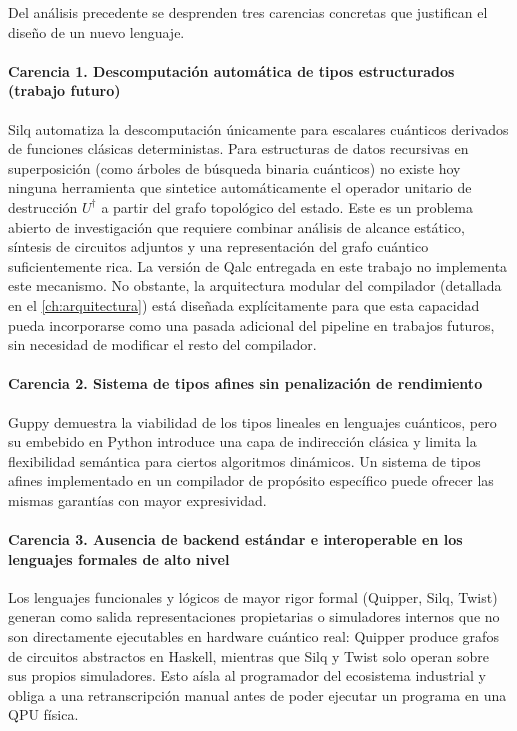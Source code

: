 Del análisis precedente se desprenden tres carencias concretas que justifican el diseño de un nuevo lenguaje.

\paragraph{Carencia 1. Descomputación automática de tipos estructurados (trabajo futuro)}
Silq automatiza la descomputación únicamente para escalares cuánticos derivados de funciones clásicas deterministas. Para estructuras de datos recursivas en superposición (como árboles de búsqueda binaria cuánticos) no existe hoy ninguna herramienta que sintetice automáticamente el operador unitario de destrucción $U^\dagger$ a partir del grafo topológico del estado. Este es un problema abierto de investigación que requiere combinar análisis de alcance estático, síntesis de circuitos adjuntos y una representación del grafo cuántico suficientemente rica. La versión de Qalc entregada en este trabajo no implementa este mecanismo. No obstante, la arquitectura modular del compilador (detallada en el \autoref{ch:arquitectura}) está diseñada explícitamente para que esta capacidad pueda incorporarse como una pasada adicional del pipeline en trabajos futuros, sin necesidad de modificar el resto del compilador.

\paragraph{Carencia 2. Sistema de tipos afines sin penalización de rendimiento}
Guppy demuestra la viabilidad de los tipos lineales en lenguajes cuánticos, pero su embebido en Python introduce una capa de indirección clásica y limita la flexibilidad semántica para ciertos algoritmos dinámicos. Un sistema de tipos afines implementado en un compilador de propósito específico puede ofrecer las mismas garantías con mayor expresividad.

\paragraph{Carencia 3. Ausencia de backend estándar e interoperable en los lenguajes formales de alto nivel}
Los lenguajes funcionales y lógicos de mayor rigor formal (Quipper, Silq, Twist) generan como salida representaciones propietarias o simuladores internos que no son directamente ejecutables en hardware cuántico real: Quipper produce grafos de circuitos abstractos en Haskell, mientras que Silq y Twist solo operan sobre sus propios simuladores. Esto aísla al programador del ecosistema industrial y obliga a una retranscripción manual antes de poder ejecutar un programa en una QPU física.

